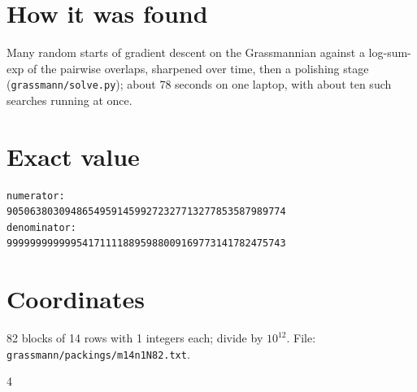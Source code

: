 \documentclass[11pt,a4paper]{article}
\begin{document}
\section{How it was found}
Many random starts of gradient descent on the Grassmannian against a log-sum-exp of the pairwise overlaps, sharpened over time, then a polishing stage (\texttt{grassmann/solve.py}); about 78 seconds on one laptop, with about ten such searches running at once.


\appendix
\section{Exact value}
{\small
\begin{verbatim}
numerator:
905063803094865495914599272327713277853587989774
denominator:
999999999999541711118895988009169773141782475743
\end{verbatim}}

\section{Coordinates}
82 blocks of 14 rows with 1 integers each; divide by $10^{12}$. File: \texttt{grassmann/packings/m14n1N82.txt}.
{\tiny
\begin{multicols}{4}
\end{multicols}}
\end{document}

